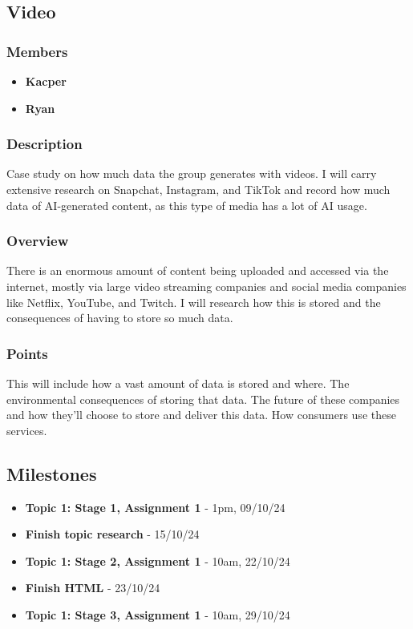 \documentclass{article}
\begin{document}
    \subsection{Video}
        \subsubsection{Members}
        \begin{itemize}
            \item \textbf{Kacper}
            \item \textbf{Ryan}
        \end{itemize}
        \subsubsection{Description}
        Case study on how much data the group generates with videos. I will carry extensive research on Snapchat, Instagram, and TikTok and record how much data 
        of AI-generated content, as this type of media has a lot of AI usage.

        \subsubsection{Overview}
        There is an enormous amount of content being uploaded and accessed via the internet, mostly via large video 
        streaming companies and social media companies like Netflix, YouTube, and Twitch. I will research
        how this is stored and the consequences of having to store so much data.

        \subsubsection{Points}
        This will include how a vast amount of data is stored and where. 
        The environmental consequences of storing that data.
        The future of these companies and how they'll choose to store and deliver this data.
        How consumers use these services.

\subsection{Milestones}
    \begin{itemize}
        \item \textbf{Topic 1: Stage 1, Assignment 1} - 1pm, 09/10/24
        \item \textbf{Finish topic research} - 15/10/24
        \item \textbf{Topic 1: Stage 2, Assignment 1} - 10am, 22/10/24
        \item \textbf{Finish HTML} - 23/10/24
        \item \textbf{Topic 1: Stage 3, Assignment 1} - 10am, 29/10/24
    \end{itemize}
\end{document}

